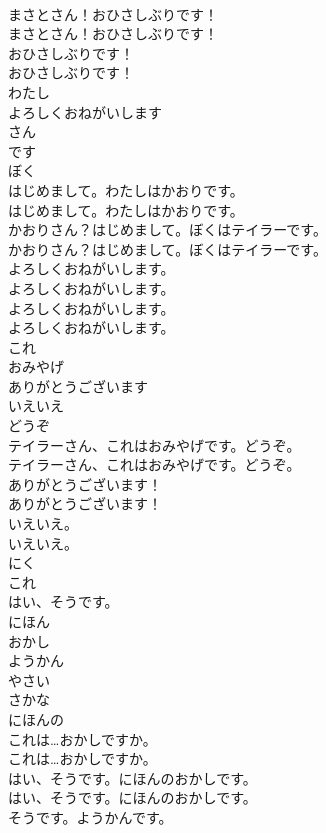 \documentclass[8pt]{extreport}
\begin{document}
\begin{CJK}{UTF8}{min}
\\	まさとさん！おひさしぶりです！	
\\	まさとさん！おひさしぶりです！ 
\\	おひさしぶりです！	
\\	おひさしぶりです！ 
\\	わたし
\\	よろしくおねがいします
\\	さん
\\	です
\\	ぼく
\\	はじめまして。わたしはかおりです。	
\\	はじめまして。わたしはかおりです。 
\\	かおりさん？はじめまして。ぼくはテイラーです。	
\\	かおりさん？はじめまして。ぼくはテイラーです。 
\\	よろしくおねがいします。	
\\	よろしくおねがいします。 
\\	よろしくおねがいします。	
\\	よろしくおねがいします。　 
\\	これ
\\	おみやげ
\\	ありがとうございます
\\	いえいえ
\\	どうぞ
\\	テイラーさん、これはおみやげです。どうぞ。	
\\	テイラーさん、これはおみやげです。どうぞ。 
\\	ありがとうございます！	
\\	ありがとうございます！ 
\\	いえいえ。	
\\	いえいえ。 
\\	にく
\\	これ
\\	はい、そうです。
\\	にほん
\\	おかし
\\	ようかん
\\	やさい
\\	さかな
\\	にほんの
\\	これは…おかしですか。	
\\	これは…おかしですか。 
\\	はい、そうです。にほんのおかしです。	
\\	はい、そうです。にほんのおかしです。 
\\	そうです。ようかんです。	

\end{CJK}
\end{document}
